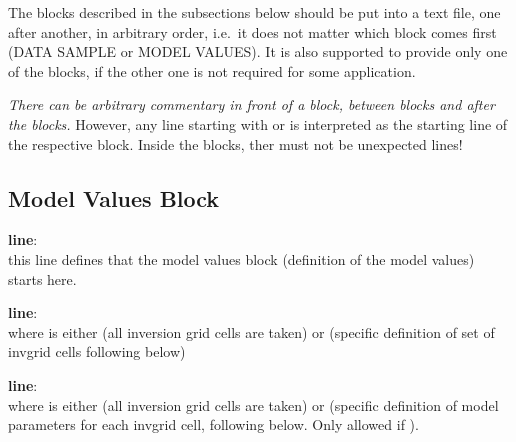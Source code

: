 The blocks described in the subsections below should be put into a text file, one after another, in arbitrary order, 
i.e.\ it does not matter which block comes first (DATA SAMPLE or MODEL VALUES). It is
also supported to provide only one of the blocks, if the other one is not required for some application. 

\emph{There can be arbitrary commentary in front of a block, between blocks and after the blocks.} However, 
any line starting with  or  is interpreted as the starting line
of the respective block. Inside the blocks, ther must not be unexpected lines!




\subsection{Model Values Block}

{\bf line}: \\
this line defines that the model values block (definition of the model values) starts here. 

{\bf line}: \\
where  is either  (all inversion grid cells are taken) or  
(specific definition of set of invgrid cells following below)

{\bf line}: \\
where  is either  (all inversion grid cells are taken) or  
(specific definition of model parameters for each invgrid cell, following below. Only allowed if 
). 

